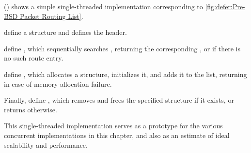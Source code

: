  ()
shows a simple single-threaded implementation corresponding to
\cref{fig:defer:Pre-BSD Packet Routing List}.
\begin{fcvref}
 define a  structure and
 defines
the  header.
\end{fcvref}
\begin{fcvref}
 define , which sequentially searches
, returning the corresponding , or
 if there is no such route entry.
\end{fcvref}
\begin{fcvref}
 define , which allocates a
 structure, initializes it, and adds it to the
list, returning  in case of memory-allocation failure.
\end{fcvref}
\begin{fcvref}
Finally,  define , which removes and
frees the specified  structure if it exists,
or returns  otherwise.
\end{fcvref}

This single-threaded implementation serves as a prototype for the various
concurrent implementations in this chapter, and also as an estimate of
ideal scalability and performance.



\IfTwoColumn{}{\FloatBarrier}

\IfTwoColumn{}{\FloatBarrier}




